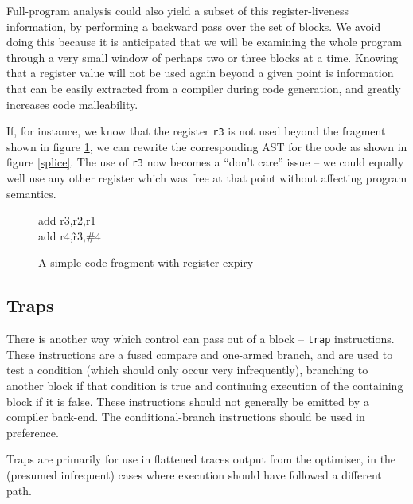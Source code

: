 \documentclass[11pt,letterpaper,twocolumn,notitlepage]{article}
\begin{document}
Full-program analysis could also yield a subset of this register-liveness information, by performing a backward pass over the set of blocks. We avoid doing this because it is anticipated that we will be examining the whole program through a very small window of perhaps two or three blocks at a time. Knowing that a register value will not be used again beyond a given point is information that can be easily extracted from a compiler during code generation, and greatly increases code malleability.

If, for instance, we know that the register {\tt r3} is not used beyond the fragment shown in figure \ref{codefrag}, we can rewrite the corresponding AST for the code as shown in figure \ref{splice}. The use of {\tt r3} now becomes a ``don't care'' issue -- we could equally well use any other register which was free at that point without affecting program semantics.

\begin{figure}[t]

\begin{code}
add r3,r2,r1\\
add r4,\~r3,\#4
\end{code}

\caption{\label{codefrag}A simple code fragment with register expiry}
\end{figure}

\begin{figure*}[t]
\centerline{}
\caption{\label{splice}Splicing two trees}
\end{figure*}

\subsection{Traps}

There is another way which control can pass out of a block -- {\tt trap} instructions. These instructions are a fused compare and one-armed branch, and are used to test a condition (which should only occur very infrequently), branching to another block if that condition is true and continuing execution of the containing block if it is false. These instructions should not generally be emitted by a compiler back-end. The conditional-branch instructions should be used in preference.

Traps are primarily for use in flattened traces output from the optimiser, in the (presumed infrequent) cases where execution should have followed a different path.
\end{document}
